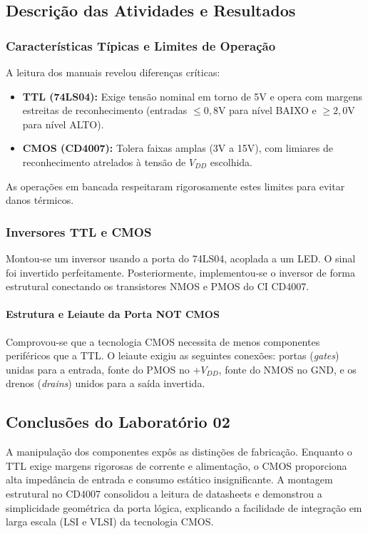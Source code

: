 \documentclass[conference]{IEEEtran}
\begin{document}
\subsection{Descrição das Atividades e Resultados}

\subsubsection{Características Típicas e Limites de Operação}
A leitura dos manuais revelou diferenças críticas:
\begin{itemize}
    \item \textbf{TTL (74LS04):} Exige tensão nominal em torno de 5V e opera com margens estreitas de reconhecimento (entradas $\le 0,8$V para nível BAIXO e $\ge 2,0$V para nível ALTO).
    \item \textbf{CMOS (CD4007):} Tolera faixas amplas (3V a 15V), com limiares de reconhecimento atrelados à tensão de $V_{DD}$ escolhida.
\end{itemize}
As operações em bancada respeitaram rigorosamente estes limites para evitar danos térmicos.

\subsubsection{Inversores TTL e CMOS}
Montou-se um inversor usando a porta do 74LS04, acoplada a um LED. O sinal foi invertido perfeitamente. Posteriormente, implementou-se o inversor de forma estrutural conectando os transistores NMOS e PMOS do CI CD4007.

\paragraph{Estrutura e Leiaute da Porta NOT CMOS}
Comprovou-se que a tecnologia CMOS necessita de menos componentes periféricos que a TTL. O leiaute exigiu as seguintes conexões: portas (\textit{gates}) unidas para a entrada, fonte do PMOS no $+V_{DD}$, fonte do NMOS no GND, e os drenos (\textit{drains}) unidos para a saída invertida.

\subsection{Conclusões do Laboratório 02}
A manipulação dos componentes expôs as distinções de fabricação. Enquanto o TTL exige margens rigorosas de corrente e alimentação, o CMOS proporciona alta impedância de entrada e consumo estático insignificante. A montagem estrutural no CD4007 consolidou a leitura de datasheets e demonstrou a simplicidade geométrica da porta lógica, explicando a facilidade de integração em larga escala (LSI e VLSI) da tecnologia CMOS.
\end{document}
